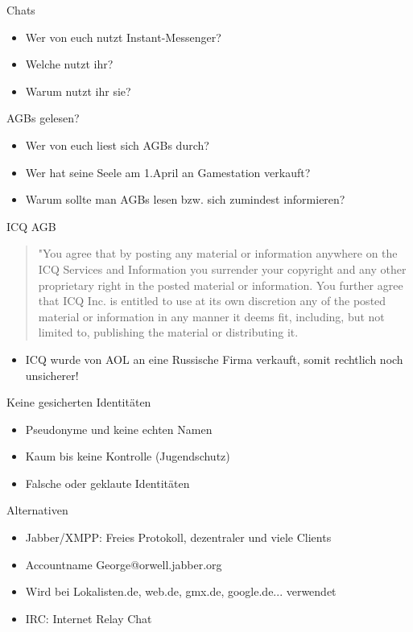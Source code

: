 \begin{frame}{Chats}
	\begin{itemize}
		\item Wer von euch nutzt Instant-Messenger?
		\item<2-> Welche nutzt ihr?
		\item<3-> Warum nutzt ihr sie?
	\end{itemize}
\end{frame}

\begin{frame}{AGBs gelesen?}
	\begin{itemize}
		\item Wer von euch liest sich AGBs durch?
		\item<2-> Wer hat seine Seele am 1.April an Gamestation verkauft?
		\item<3-> Warum sollte man AGBs lesen bzw. sich zumindest informieren?
	\end{itemize}
\end{frame}
\begin{frame}{ICQ AGB}
	\begin{quotation}
		"You agree that by posting any material or information anywhere on the ICQ Services 
		and Information you surrender your copyright and any other proprietary right in the
		posted material or information. You further agree that ICQ Inc. is entitled to use at 
		its own discretion any of the posted material or information in any manner it deems fit, 
		including, but not limited to, publishing the material or distributing it.
	\end{quotation}
	\begin{itemize}
		\item ICQ wurde von AOL an eine Russische Firma verkauft, somit rechtlich noch unsicherer!
	\end{itemize}
\end{frame}

\begin{frame}{Keine gesicherten Identitäten}
	\begin{itemize}
		\item Pseudonyme und keine echten Namen
		\item Kaum bis keine Kontrolle (Jugendschutz)
		\item Falsche oder geklaute Identit\"aten
	\end{itemize}
\end{frame}

\begin{frame}{Alternativen}
	\begin{itemize}
		\item Jabber/XMPP: Freies Protokoll, dezentraler und viele Clients
		\item Accountname George@orwell.jabber.org
		\item Wird bei Lokalisten.de, web.de, gmx.de, google.de... verwendet
		\item IRC: Internet Relay Chat
	\end{itemize}
\end{frame}

